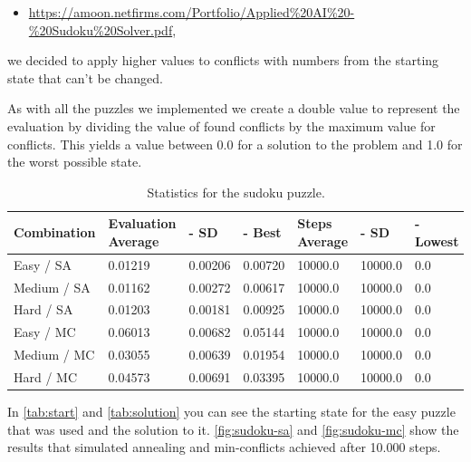 \documentclass{scrartcl}
\begin{document}
\begin{itemize}
\item \url{https://amoon.netfirms.com/Portfolio/Applied%20AI%20-%20Sudoku%20Solver.pdf},
\end{itemize}

we decided to apply higher values to conflicts with numbers from the starting state that can't be changed.

As with all the puzzles we implemented we create a double value to represent the evaluation by dividing the value of found conflicts by the maximum value for conflicts. This yields a value between 0.0 for a solution to the problem and 1.0 for the worst possible state.


\begin{table}[!htbp]
\caption{Statistics for the sudoku puzzle.}
\begin{tabularx}{\textwidth}{l | X | X | X | X | X | X}
Combination & Evaluation  \newline Average & - \newline SD & - \newline Best & Steps \newline Average & - \newline SD & - \newline Lowest \\
\hline
Easy / SA & 0.01219 & 0.00206 & 0.00720 & 10000.0 & 10000.0 & 0.0 \\
Medium / SA  & 0.01162 & 0.00272 & 0.00617 & 10000.0 & 10000.0 & 0.0  \\
Hard / SA  & 0.01203 & 0.00181 & 0.00925  & 10000.0 & 10000.0 & 0.0 \\
Easy / MC  & 0.06013 & 0.00682 & 0.05144  & 10000.0 & 10000.0 & 0.0 \\
Medium / MC & 0.03055 & 0.00639 & 0.01954 & 10000.0 & 10000.0 & 0.0  \\
Hard / MC & 0.04573 & 0.00691 & 0.03395  & 10000.0 & 10000.0 & 0.0  \\
\end{tabularx}
\end{table}


In \autoref{tab:start} and \autoref{tab:solution} you can see the starting state for the easy puzzle that was used and the solution to it. \autoref{fig:sudoku-sa} and \autoref{fig:sudoku-mc} show the results that simulated annealing and min-conflicts achieved after 10.000 steps.
\end{document}
